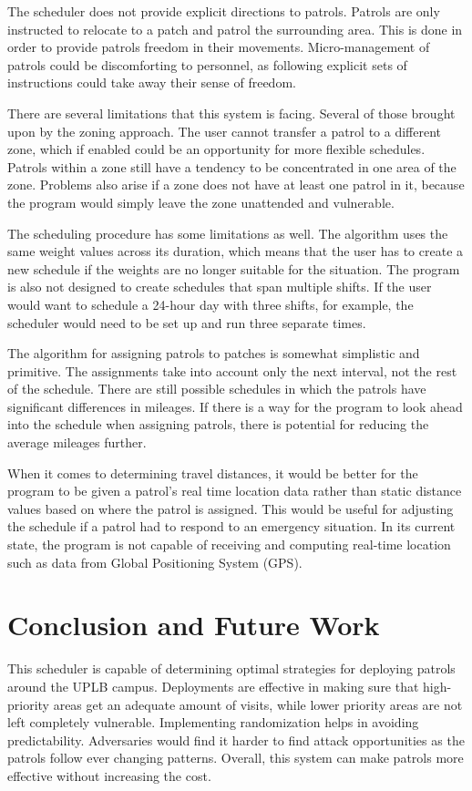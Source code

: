 \documentclass[journal]{./IEEE/IEEEtran}
\begin{document}
The scheduler does not provide explicit directions to patrols. Patrols are only instructed to relocate to a patch and patrol the surrounding area. This is done in order to provide patrols freedom in their movements. Micro-management of patrols could be discomforting to personnel, as following explicit sets of instructions could take away their sense of freedom.

There are several limitations that this system is facing. Several of those brought upon by the zoning approach. The user cannot transfer a patrol to a different zone, which if enabled could be an opportunity for more flexible schedules. Patrols within a zone still have a tendency to be concentrated in one area of the zone. Problems also arise if a zone does not have at least one patrol in it, because the program would simply leave the zone unattended and vulnerable.

The scheduling procedure has some limitations as well. The algorithm uses the same weight values across its duration, which means that the user has to create a new schedule if the weights are no longer suitable for the situation. The program is also not designed to create schedules that span multiple shifts. If the user would want to schedule a 24-hour day with three shifts, for example, the scheduler would need to be set up and run three separate times.

The algorithm for assigning patrols to patches is somewhat simplistic and primitive. The assignments take into account only the next interval, not the rest of the schedule. There are still possible schedules in which the patrols have significant differences in mileages. If there is a way for the program to look ahead into the schedule when assigning patrols, there is potential for reducing the average mileages further.

When it comes to determining travel distances, it would be better for the program to be given a patrol's real time location data rather than static distance values based on where the patrol is assigned. This would be useful for adjusting the schedule if a patrol had to respond to an emergency situation. In its current state, the program is not capable of receiving and computing real-time location such as data from Global Positioning System (GPS).

\section{Conclusion and Future Work}
This scheduler is capable of determining optimal strategies for deploying patrols around the UPLB campus. Deployments are effective in making sure that high-priority areas get an adequate amount of visits, while lower priority areas are not left completely vulnerable. Implementing randomization helps in avoiding predictability. Adversaries would find it harder to find attack opportunities as the patrols follow ever changing patterns. Overall, this system can make patrols more effective without increasing the cost.
\end{document}
